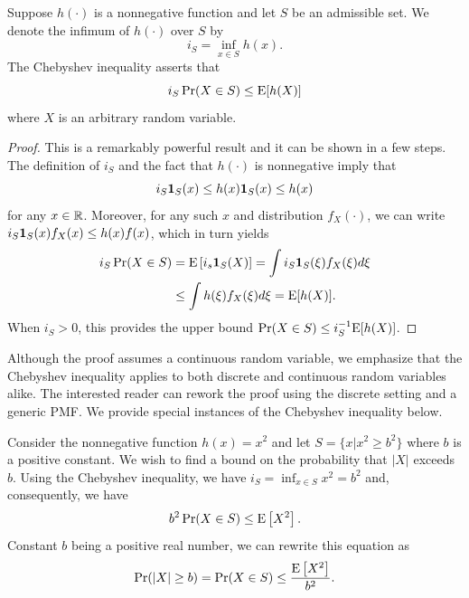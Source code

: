 \begin{proposition}
Suppose $h (\cdot)$ is a nonnegative function and let $S$ be an admissible set.
We denote the infimum of $h (\cdot)$ over $S$ by
\begin{equation*}
i_S = \inf_{ x \in S } h (x) .
\end{equation*}
The Chebyshev inequality asserts that
\begin{equation} \label{equation:ChebyshevInequality}
i_S \Pr (X \in S)
\leq \mathrm{E} [ h(X) ]
\end{equation}
where $X$ is an arbitrary random variable.
\end{proposition}
\begin{proof}
This is a remarkably powerful result and it can be shown in a few steps.
The definition of $i_S$ and the fact that $h (\cdot)$ is nonnegative imply that
\begin{equation*}
i_S \mathbf{1}_S (x) \leq h(x) \mathbf{1}_S (x) \leq h(x)
\end{equation*}
for any $x \in \mathbb{R}$.
Moreover, for any such $x$ and distribution $f_X(\cdot)$, we can write $i_S \mathbf{1}_S (x) f_X(x) \leq h(x) f(x)$, which in turn yields
\begin{equation*}
\begin{split}
i_S \Pr (X \in S) &= \mathrm{E} \left[ i_s \mathbf{1}_S (X) \right]
= \int i_S \mathbf{1}_S (\xi) f_X(\xi) d\xi \\
&\leq \int h (\xi) f_X(\xi) d\xi
= \mathrm{E} [ h(X) ] .
\end{split}
\end{equation*}
When $i_S > 0$, this provides the upper bound $\Pr (X \in S) \leq i_S^{-1} \mathrm{E} [h (X)]$.
\end{proof}

Although the proof assumes a continuous random variable, we emphasize that the Chebyshev inequality applies to both discrete and continuous random variables alike.
The interested reader can rework the proof using the discrete setting and a generic PMF.
We provide special instances of the Chebyshev inequality below.

\begin{example}
Consider the nonnegative function $h(x) = x^2$ and let $S = \{ x | x^2 \geq b^2 \}$ where $b$ is a positive constant.
We wish to find a bound on the probability that $|X|$ exceeds $b$.
Using the Chebyshev inequality, we have $i_S = \inf_{x \in S} x^2 = b^2$ and, consequently, we have
\begin{equation*}
b^2 \Pr (X \in S) \leq \mathrm{E} \left[ X^2 \right] .
\end{equation*}
Constant $b$ being a positive real number, we can rewrite this equation as
\begin{equation*}
\Pr (|X| \geq b) = \Pr (X \in S) \leq \frac{\mathrm{E} \left[ X^2 \right]}{b^2} .
\end{equation*}
\end{example}

